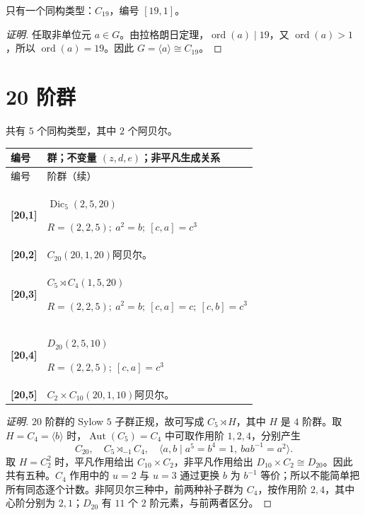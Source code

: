 \documentclass[UTF8,fontset=fandol,11pt,a4paper]{ctexart}
\newcommand{\Aut}{\operatorname{Aut}}\newcommand{\GL}{\operatorname{GL}}\newcommand{\ord}{\operatorname{ord}}\newcommand{\Z}{\mathrm Z}
\begin{document}
只有一个同构类型：$C_{19}$，编号 $[19,1]$。

\begin{proof}[证明]
任取非单位元 $a\in G$。由拉格朗日定理，$\ord(a)\mid 19$，又 $\ord(a)>1$，所以 $\ord(a)=19$。因此 $G=\langle a\rangle\cong C_{19}$。
\end{proof}

\section*{20 阶群}\label{order:20}

共有 $5$ 个同构类型，其中 $2$ 个阿贝尔。

\begingroup\small\setlength{\tabcolsep}{3pt}\renewcommand{\arraystretch}{1.12}

\begin{longtable}{@{}p{17mm}>{\raggedright\arraybackslash}p{141mm}@{}}

\toprule 编号 & 群；不变量 $(z,d,e)$；非平凡生成关系\\\midrule\endfirsthead

\toprule 编号 & 20 阶群（续）\\\midrule\endhead\bottomrule\endfoot

\textbf{[20,1]} & $\operatorname{Dic}_5$\quad $(2,5,20)$\par\(R=(2,2,5);\allowbreak\ a^{2}=b;\allowbreak\ [c,a]=c^{3}\)\\[3pt]

\textbf{[20,2]} & $C_{20}$\quad $(20,1,20)$\quad 阿贝尔。\\[3pt]

\textbf{[20,3]} & $C_{5}\rtimes C_{4}$\quad $(1,5,20)$\par\(R=(2,2,5);\allowbreak\ a^{2}=b;\allowbreak\ [c,a]=c;\allowbreak\ [c,b]=c^{3}\)\\[3pt]

\textbf{[20,4]} & $D_{20}$\quad $(2,5,10)$\par\(R=(2,2,5);\allowbreak\ [c,a]=c^{3}\)\\[3pt]

\textbf{[20,5]} & $C_{2}\times C_{10}$\quad $(20,1,10)$\quad 阿贝尔。\\[3pt]

\end{longtable}\endgroup

\begin{proof}[证明]
$20$ 阶群的 Sylow $5$ 子群正规，故可写成 $C_5\rtimes H$，其中 $H$ 是 $4$ 阶群。取 $H=C_4=\langle b\rangle$ 时，$\Aut(C_5)=C_4$ 中可取作用阶 $1,2,4$，分别产生
\[
C_{20},\quad C_5\rtimes_{-1}C_4,\quad
\langle a,b\mid a^5=b^4=1,\ bab^{-1}=a^2\rangle.
\]
取 $H=C_2^2$ 时，平凡作用给出 $C_{10}\times C_2$，非平凡作用给出 $D_{10}\times C_2\cong D_{20}$。因此共有五种。$C_4$ 作用中的 $u=2$ 与 $u=3$ 通过更换 $b$ 为 $b^{-1}$ 等价；所以不能简单把所有同态逐个计数。非阿贝尔三种中，前两种补子群为 $C_4$，按作用阶 $2,4$，其中心阶分别为 $2,1$；$D_{20}$ 有 $11$ 个 $2$ 阶元素，与前两者区分。
\end{proof}
\end{document}
